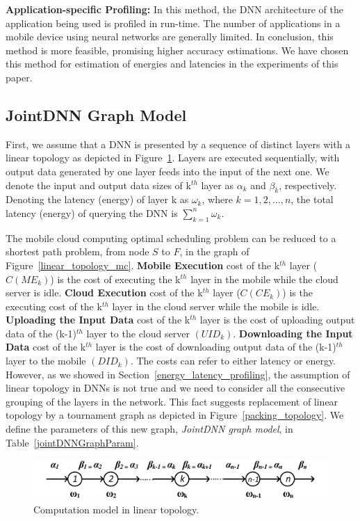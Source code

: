 \textbf{Application-specific Profiling:} In this method, the DNN architecture of the application being used is profiled in run-time. The number of applications in a mobile device using neural networks are generally limited. In conclusion, this method is more feasible, promising higher accuracy estimations. We have chosen this method for estimation of energies and latencies in the experiments of this paper. %

\subsection{JointDNN Graph Model}
First, we assume that a DNN is presented by a sequence of distinct layers with a linear topology as depicted in Figure~\ref{linear_topology}. Layers are executed sequentially, with output data generated by one layer feeds into the input of the next one. We denote the input and output data sizes of k$^{th}$ layer as $\alpha_k$ and $\beta_k$, respectively. Denoting the latency (energy) of layer k as $\omega_k$, where $k = 1, 2, ..., n$, the total latency (energy) of querying the DNN is $\sum_{k=1}^{n}{\omega_k}$.


The mobile cloud computing optimal scheduling problem can be reduced to a shortest path problem, from node $S$ to $F$, in the graph of Figure~\ref{linear_topology_mc}. \textbf{Mobile Execution} cost of the k$^{th}$ layer ($C(ME_k)$) is the cost of executing the k$^{th}$ layer in the mobile while the cloud server is idle. \textbf{Cloud Execution} cost of the k$^{th}$ layer ($C(CE_k)$) is the executing cost of the k$^{th}$ layer in the cloud server while the mobile is idle. \textbf{Uploading the Input Data} cost of the k$^{th}$ layer is the cost of uploading output data of the (k-1)$^{th}$ layer to the cloud server $(UID_k)$. \textbf{Downloading the Input Data} cost of the k$^{th}$ layer is the cost of downloading output data of the (k-1)$^{th}$ layer to the mobile $(DID_k)$. The costs can refer to either latency or energy. However, as we showed in Section~\ref{energy_latency_profiling}, the assumption of linear topology in DNNs is not true and we need to consider all the consecutive grouping of the layers in the network. This fact suggests replacement of linear topology by a tournament graph as depicted in Figure~\ref{packing_topology}. We define the parameters of this new graph, \textit{JointDNN graph model}, in Table~\ref{jointDNNGraphParam}. 

\begin{figure}[t]
\includegraphics{linear_topology}
\caption{Computation model in linear topology.}\label{linear_topology}
\end{figure}


